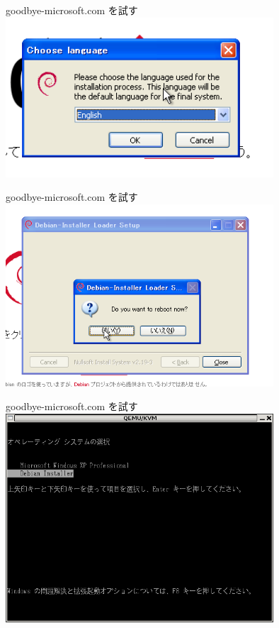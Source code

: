 \documentclass[cjk,dvipdfmx]{beamer}
\begin{document}
\begin{frame}[containsverbatim]{goodbye-microsoft.com を試す}
\includegraphics[width=10cm]{image200703/goodbyemicrosoftcom4.png}\\
\end{frame}
\begin{frame}[containsverbatim]{goodbye-microsoft.com を試す}
\includegraphics[width=10cm]{image200703/goodbyemicrosoftcom5.png}
\end{frame}
\begin{frame}[containsverbatim]{goodbye-microsoft.com を試す}
\includegraphics[width=10cm]{image200703/goodbyemicrosoftcom6.png}\\
\end{frame}
\end{document}

